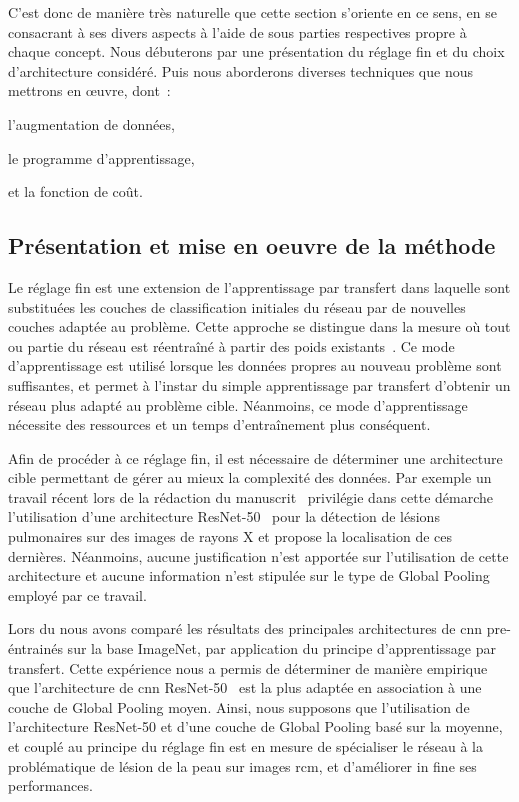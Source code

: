 C'est donc de manière très naturelle que cette section s'oriente en ce sens, en se consacrant à ses divers aspects à l'aide de sous parties respectives propre à chaque concept. Nous débuterons par une présentation du réglage fin et du choix d'architecture considéré. Puis nous aborderons diverses techniques que nous mettrons en œuvre, dont~:
\begin{inlinerate}
    \item l'augmentation de données,
    \item le programme d'apprentissage,
    \item et la fonction de coût.
\end{inlinerate}\par

\subsection{Présentation et mise en oeuvre de la méthode}
Le réglage fin est une extension de l'apprentissage par transfert dans laquelle sont substituées les couches de classification initiales du réseau par de nouvelles couches adaptée au problème. Cette approche se distingue dans la mesure où tout ou partie du réseau est réentraîné à partir des poids existants~\cite{Tajbakhsh2016}. Ce mode d'apprentissage est utilisé lorsque les données propres au nouveau problème sont suffisantes, et permet à l'instar du simple apprentissage par transfert d'obtenir un réseau plus adapté au problème cible. Néanmoins, ce mode d'apprentissage nécessite des ressources et un temps d'entraînement plus conséquent.\par

Afin de procéder à ce réglage fin, il est nécessaire de déterminer une architecture cible permettant de gérer au mieux la complexité des données. Par exemple un travail récent lors de la rédaction du manuscrit~\cite{Park2019} privilégie dans cette démarche l'utilisation d'une architecture ResNet-50~\cite{He2016} pour la détection de lésions pulmonaires sur des images de rayons X et propose la localisation de ces dernières. Néanmoins, aucune justification n'est apportée sur l'utilisation de cette architecture et aucune information n'est stipulée sur le type de Global Pooling employé par ce travail.\par

Lors du  nous avons comparé les résultats des principales architectures de \gls{cnn} pre-éntrainés sur la base ImageNet, par application du principe d'apprentissage par transfert. Cette expérience nous a permis de déterminer de manière empirique que l'architecture de \gls{cnn} ResNet-50~\cite{He2016} est la plus adaptée en association à une couche de Global Pooling moyen. Ainsi, nous supposons que l'utilisation de l'architecture ResNet-50 et d'une couche de Global Pooling basé sur la moyenne, et couplé au principe du réglage fin est en mesure de spécialiser le réseau à la problématique de lésion de la peau sur images \gls{rcm}, et d'améliorer in fine ses performances.\par

